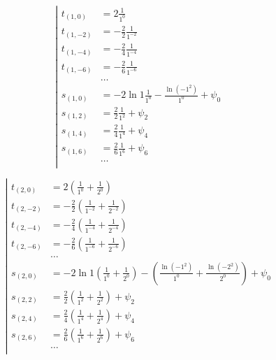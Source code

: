 \begin{equation*} \left| \begin{aligned}
t_{(1,0)} &=
  2 \frac{1}{1^0} \\
%
t_{(1,-2)} &=
- \frac{2}{2}
  \frac{1}{1^{-2}} \\
%
t_{(1,-4)} &=
- \frac{2}{4}
  \frac{1}{1^{-4}} \\
%
t_{(1,-6)} &=
- \frac{2}{6}
  \frac{1}{1^{-6}} \\
&\ldots \\
%
s_{(1,0)} &=
- 2 \ln{1}
  \frac{1}{1^0}
- \frac{\ln{(- 1^2)}}{1^0}
+ \psi_0 \\
%
s_{(1,2)} &=
  \frac{2}{2}
  \frac{1}{1^2}
+ \psi_2 \\
%
s_{(1,4)} &=
  \frac{2}{4}
  \frac{1}{1^4}
+ \psi_4 \\
%
s_{(1,6)} &=
  \frac{2}{6}
  \frac{1}{1^6}
+ \psi_6 \\
%
&\ldots \\
\end{aligned} \right. \end{equation*}

\begin{equation*} \left| \begin{aligned}
t_{(2,0)} &=
  2
  \left(
  \frac{1}{1^0}
+ \frac{1}{2^0}
  \right) \\
%
t_{(2,-2)} &=
- \frac{2}{2}
  \left(
  \frac{1}{1^{-2}}
+ \frac{1}{2^{-2}}
  \right) \\
%
t_{(2,-4)} &=
- \frac{2}{4}
  \left(
  \frac{1}{1^{-4}}
+ \frac{1}{2^{-4}}
  \right) \\
%
t_{(2,-6)} &=
- \frac{2}{6}
  \left(
  \frac{1}{1^{-6}}
+ \frac{1}{2^{-6}}
  \right) \\
%
&\ldots \\
%
s_{(2,0)} &=
- 2 \ln{1}
  \left(
  \frac{1}{1^0}
+ \frac{1}{2^0}
  \right)
- \left(
  \frac{\ln{(- 1^2)}}{1^0}
+ \frac{\ln{(- 2^2)}}{2^0}
  \right)
+ \psi_0 \\
%
s_{(2,2)} &=
  \frac{2}{2}
  \left(
  \frac{1}{1^2}
+ \frac{1}{2^2}
  \right)
+ \psi_2 \\
%
s_{(2,4)} &=
  \frac{2}{4}
  \left(
  \frac{1}{1^4}
+ \frac{1}{2^4}
  \right)
+ \psi_4 \\
%
s_{(2,6)} &=
  \frac{2}{6}
  \left(
  \frac{1}{1^6}
+ \frac{1}{2^6}
  \right)
+ \psi_6 \\
%
&\ldots \\
\end{aligned} \right. \end{equation*}

